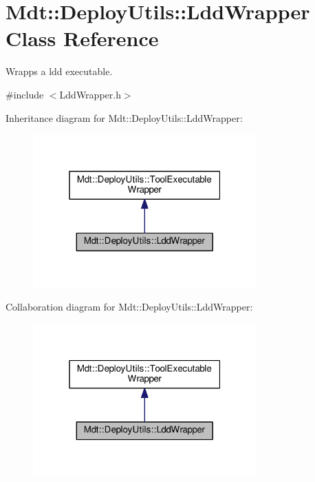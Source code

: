 \hypertarget{class_mdt_1_1_deploy_utils_1_1_ldd_wrapper}{}\section{Mdt\+:\+:Deploy\+Utils\+:\+:Ldd\+Wrapper Class Reference}
\label{class_mdt_1_1_deploy_utils_1_1_ldd_wrapper}


Wrapps a ldd executable.  




{\ttfamily \#include $<$Ldd\+Wrapper.\+h$>$}



Inheritance diagram for Mdt\+:\+:Deploy\+Utils\+:\+:Ldd\+Wrapper\+:\nopagebreak
\begin{figure}[H]
\begin{center}
\leavevmode
\includegraphics[width=244pt]{class_mdt_1_1_deploy_utils_1_1_ldd_wrapper__inherit__graph}
\end{center}
\end{figure}


Collaboration diagram for Mdt\+:\+:Deploy\+Utils\+:\+:Ldd\+Wrapper\+:\nopagebreak
\begin{figure}[H]
\begin{center}
\leavevmode
\includegraphics[width=244pt]{class_mdt_1_1_deploy_utils_1_1_ldd_wrapper__coll__graph}
\end{center}
\end{figure}
